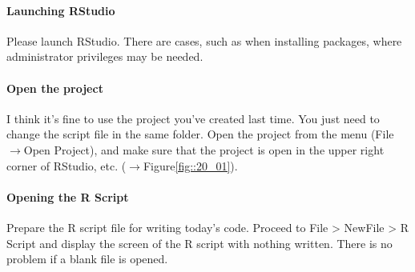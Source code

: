 \documentclass{ltjsarticle}
\begin{document}
\paragraph{Launching RStudio} Please launch RStudio. There are cases, such as when installing packages, where administrator privileges may be needed.
\paragraph{Open the project} I think it's fine to use the project you've created last time. You just need to change the script file in the same folder. Open the project from the menu (File$\to$Open Project), and make sure that the project is open in the upper right corner of RStudio, etc. ($\to$Figure\ref{fig::20_01}).
\paragraph{Opening the R Script} Prepare the R script file for writing today's code. Proceed to File > NewFile > R Script and display the screen of the R script with nothing written. There is no problem if a blank file is opened.
\end{document}
